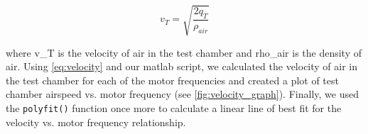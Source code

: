 \begin{equation} \label{eq:velocity}
    v_T = \sqrt{\frac{2q_T}{\rho_{air}}}
\end{equation}

\noindent{} where \gls{v_T} is the velocity of air in the test chamber and \gls{rho_air} is the density of air. Using \autoref{eq:velocity} and our \acrshort{matlab} script, we calculated the velocity of air in the test chamber for each of the motor frequencies and created a plot of test chamber airspeed vs. motor frequency (see \autoref{fig:velocity_graph}). Finally, we used the \verb|polyfit()| function once more to calculate a linear line of best fit for the velocity vs. motor frequency relationship.
